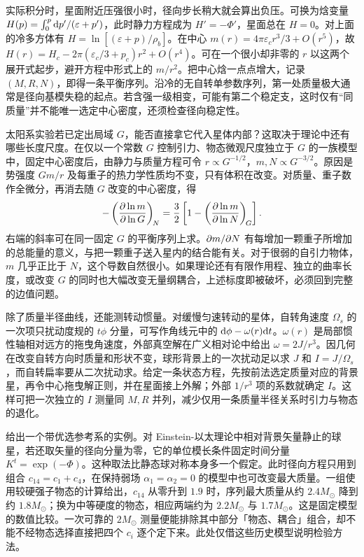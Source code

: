 实际积分时，星面附近压强很小时，径向步长稍大就会算出负压。可换为焓变量 $H(p)=\int_0^p\dd p'/(\varepsilon+p')$，此时静力方程成为 $H'=-\Phi'$，星面总在 $H=0$。对上面的冷多方体有 $H=\ln[(\varepsilon+p)/\rho_b]$。在中心 $m(r)=4\pi\varepsilon_c r^3/3+O(r^5)$，故 $H(r)=H_c-2\pi(\varepsilon_c/3+p_c)r^2+O(r^4)$。可在一个很小却非零的 $r$ 以这两个展开式起步，避开方程中形式上的 $m/r^2$。把中心焓一点点增大，记录 $(M,R,N)$，即得一条平衡序列。沿冷的无自转单参数序列，第一处质量极大通常是径向基模失稳的起点。若含强一级相变，可能有第二个稳定支，这时仅有“同质量”并不能唯一选定中心密度，还须检查径向稳定性。

太阳系实验若已定出局域 $G$，能否直接拿它代入星体内部？这取决于理论中还有哪些长度尺度。在仅以一个常数 $G$ 控制引力、物态微观尺度独立于 $G$ 的一族模型中，固定中心密度后，由静力与质量方程可令 $r\propto G^{-1/2}$，$m,N\propto G^{-3/2}$。原因是势强度 $Gm/r$ 及每重子的热力学性质均不变，只有体积在改变。对质量、重子数作全微分，再消去随 $G$ 改变的中心密度，得
\[
 -\left(\frac{\partial\ln m}{\partial\ln G}\right)_{\!N}
 =\frac32\left[1-\left(\frac{\partial\ln m}{\partial\ln N}\right)_{\!G}\right].
\]
右端的斜率可在同一固定 $G$ 的平衡序列上求。$\partial m/\partial N$ 有每增加一颗重子所增加的总能量的意义，与把一颗重子送入星内的结合能有关。对于很弱的自引力物体，$m$ 几乎正比于 $N$，这个导数自然很小。如果理论还有有限作用程、独立的曲率长度，或改变 $G$ 的同时也大幅改变无量纲耦合，上述标度即被破坏，必须回到完整的边值问题。

除了质量半径曲线，还能测转动惯量。对缓慢匀速转动的星体，自转角速度 $\Omega_s$ 的一次项只扰动度规的 $t\phi$ 分量，可写作角线元中的 $\dd\phi-\omega(r)\dd t$。$\omega(r)$ 是局部惯性轴相对远方的拖曳角速度，外部真空解在广义相对论中给出 $\omega=2J/r^3$。因几何在改变自转方向时质量和形状不变，球形背景上的一次扰动足以求 $J$ 和 $I=J/\Omega_s$，而自转扁率要从二次扰动求。给定一条状态方程，先按前法选定质量对应的背景星，再令中心拖曳解正则，并在星面接上外解；外部 $1/r^3$ 项的系数就确定 $I$。这样可把一次独立的 $I$ 测量同 $M,R$ 并列，减少仅用一条质量半径关系时引力与物态的退化。

给出一个带优选参考系的实例。对 Einstein-以太理论中相对背景矢量静止的球星，若还取矢量的径向分量为零，它的单位模长条件固定时间分量 $K^t=\exp(-\Phi)$。这种取法比静态球对称本身多一个假定。此时径向方程只用到组合 $c_{14}=c_1+c_4$，在保持弱场 $\alpha_1=\alpha_2=0$ 的模型中也可改变最大质量。一组使用较硬强子物态的计算给出，$c_{14}$ 从零升到 $1.9$ 时，序列最大质量从约 $2.4M_\odot$ 降到约 $1.8M_\odot$；换为中等硬度的物态，相应两端约为 $2.2M_\odot$ 与 $1.7M_\odot$。这是固定模型的数值比较。一次可靠的 $2M_\odot$ 测量便能排除其中部分「物态、耦合」组合，却不能不经物态选择直接把四个 $c_i$ 逐个定下来。此处仅借这些历史模型说明检验方法。

